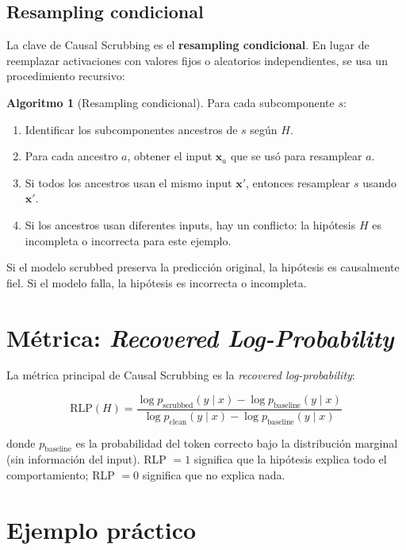 \documentclass[11pt,a4paper]{report}
\theoremstyle{definition}
\newtheorem{algoritmo}{Algoritmo}[chapter]
\begin{document}
\subsection{Resampling condicional}

La clave de Causal Scrubbing es el \textbf{resampling condicional}. En lugar de reemplazar activaciones con valores fijos o aleatorios independientes, se usa un procedimiento recursivo:

\begin{algoritmo}[Resampling condicional]
\label{alg:resampling}
Para cada subcomponente $s$:
\begin{enumerate}
    \item Identificar los subcomponentes ancestros de $s$ según $H$.
    \item Para cada ancestro $a$, obtener el input $\mathbf{x}_a$ que se usó para resamplear $a$.
    \item Si todos los ancestros usan el mismo input $\mathbf{x}'$, entonces resamplear $s$ usando $\mathbf{x}'$.
    \item Si los ancestros usan diferentes inputs, hay un conflicto: la hipótesis $H$ es incompleta o incorrecta para este ejemplo.
\end{enumerate}

\end{algoritmo}

Si el modelo scrubbed preserva la predicción original, la hipótesis es causalmente fiel. Si el modelo falla, la hipótesis es incorrecta o incompleta.

\section{Métrica: \emph{Recovered Log-Probability}}

La métrica principal de Causal Scrubbing es la \emph{recovered log-probability}:

\[
\text{RLP}(H) = \frac{\log p_{\text{scrubbed}}(y \mid x) - \log p_{\text{baseline}}(y \mid x)}{\log p_{\text{clean}}(y \mid x) - \log p_{\text{baseline}}(y \mid x)}
\]

donde $p_{\text{baseline}}$ es la probabilidad del token correcto bajo la distribución marginal (sin información del input). RLP $= 1$ significa que la hipótesis explica todo el comportamiento; RLP $= 0$ significa que no explica nada.

\section{Ejemplo práctico}
\end{document}
